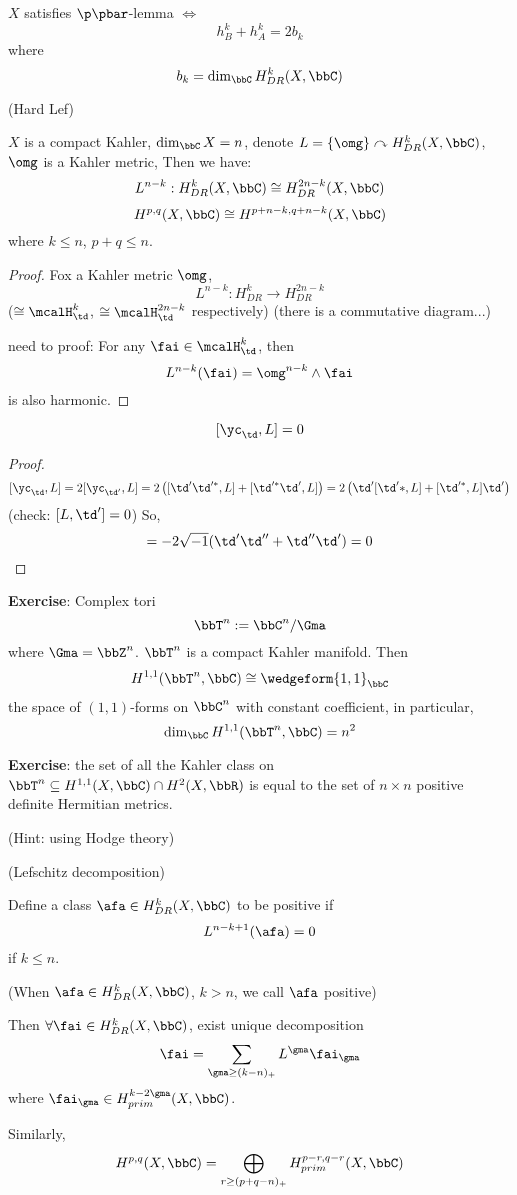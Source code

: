 \begin{thm}
$X$ satisfies $\p\pbar$-lemma $\iff$
$$h_B^k+h_A^k=2b_k$$
where 
$$b_k=\dim_\bbC H_{DR}^k(X,\bbC)$$
\end{thm}

\begin{thm}(Hard Lef)

$X$ is a compact Kahler, $\dim_\bbC X=n$, denote 
$L=\{\omg\}\curvearrowright H_{DR}^k(X,\bbC)$, $\omg$ is a Kahler metric, 
Then we have:
$$L^{n-k}: H_{DR}^k(X,\bbC)\cong H_{DR}^{2n-k}(X,\bbC)$$
$$H^{p,q}(X,\bbC)\cong H^{p+n-k,q+n-k}(X,\bbC)$$
where $k\leq n$, $p+q\leq n$. 
\end{thm}

\begin{proof}Fox a Kahler metric $\omg$,
$$L^{n-k}:H_{DR}^k\to H_{DR}^{2n-k}$$
($\cong \mcalH_\td^k$, $\cong\mcalH_{\td}^{2n-k}$ respectively)
(there is a commutative diagram...)

need to proof: For any $\fai\in\mcalH_\td^k$, then
$$L^{n-k}(\fai)=\omg^{n-k}\wedge\fai$$
is also harmonic.
\end{proof}

\begin{lemma}
$$[\yc_{\td},L]=0$$
\end{lemma}

\begin{proof}
$$[\yc_\td,L]=2[\yc_{\td'},L]
=2\left([\td'\td'^*,L]+[\td'^*\td',L]\right)
=2\left(\td'[\td'*,L]+[\td'^*,L]\td'\right)$$
(check: $[L,\td']=0$)
So, 
$$=-2\sqrt{-1}(\td'\td''+\td''\td')=0$$
\end{proof}

\textbf{Exercise}: Complex tori 
$$\bbT^n:=\bbC^n/\Gma$$
where $\Gma=\bbZ^n$. $\bbT^n$ is a compact Kahler manifold.
Then
$$H^{1,1}(\bbT^n,\bbC)\cong\wedgeform{1,1}_{\bbC}$$
the space of $(1,1)$-forms on $\bbC^n$ with constant coefficient, 
in particular, 
$$\dim_\bbC H^{1,1}(\bbT^n,\bbC)=n^2$$

\textbf{Exercise}: the set of all the Kahler class on $\bbT^n
\subseteq H^{1,1}(X,\bbC)\cap H^2(X,\bbR)$ is equal to 
the set of $n\times n$ positive definite Hermitian metrics.

(Hint: using Hodge theory)

\begin{thm}(Lefschitz decomposition)

Define a class $\afa\in H^{k}_{DR}(X,\bbC)$
to be positive if
$$L^{n-k+1}(\afa)=0$$
if $k\leq n$.

(When $\afa\in H^k_{DR}(X,\bbC)$, $k>n$, we call $\afa$ positive)

Then $\forall\fai\in H^k_{DR}(X,\bbC)$, exist unique decomposition 
$$\fai=\sum_{\gma\geq(k-n)_+}
L^\gma\fai_\gma$$
where $\fai_\gma\in H_{prim}^{k-2\gma}(X,\bbC)$.

Similarly, 
$$H^{p,q}(X,\bbC)=\bigoplus_{r\geq(p+q-n)_+} H_{prim}^{p-r,q-r}(X,\bbC)$$
\end{thm}  


